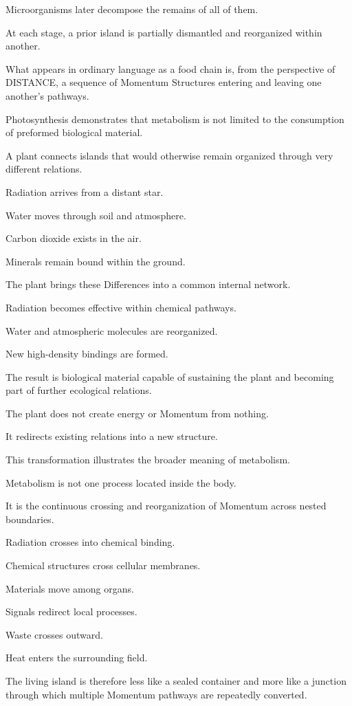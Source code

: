 Microorganisms later decompose the remains of all of them.

At each stage, a prior island is partially dismantled and reorganized within another.

What appears in ordinary language as a food chain is, from the perspective of DISTANCE, a sequence of Momentum Structures entering and leaving one another’s pathways.

Photosynthesis demonstrates that metabolism is not limited to the consumption of preformed biological material.

A plant connects islands that would otherwise remain organized through very different relations.

Radiation arrives from a distant star.

Water moves through soil and atmosphere.

Carbon dioxide exists in the air.

Minerals remain bound within the ground.

The plant brings these Differences into a common internal network.

Radiation becomes effective within chemical pathways.

Water and atmospheric molecules are reorganized.

New high-density bindings are formed.

The result is biological material capable of sustaining the plant and becoming part of further ecological relations.

The plant does not create energy or Momentum from nothing.

It redirects existing relations into a new structure.

This transformation illustrates the broader meaning of metabolism.

Metabolism is not one process located inside the body.

It is the continuous crossing and reorganization of Momentum across nested boundaries.

Radiation crosses into chemical binding.

Chemical structures cross cellular membranes.

Materials move among organs.

Signals redirect local processes.

Waste crosses outward.

Heat enters the surrounding field.

The living island is therefore less like a sealed container and more like a junction through which multiple Momentum pathways are repeatedly converted.

